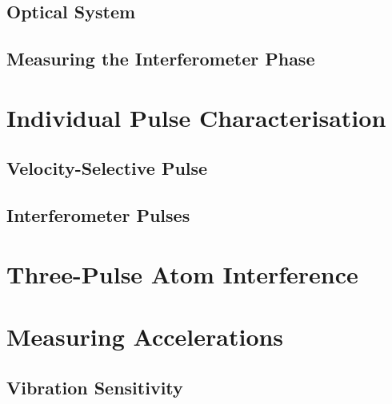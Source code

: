 \subsection{Optical System}
\subsection{Measuring the Interferometer Phase}

\section{Individual Pulse Characterisation} \label{sec:atomint_rabiosc}
\subsection{Velocity-Selective Pulse}
\subsection{Interferometer Pulses}

\section{Three-Pulse Atom Interference} \label{sec:atomint_threepulse}

\section{Measuring Accelerations}\label{sec:atomint_accelerations}
\subsection{Vibration Sensitivity}